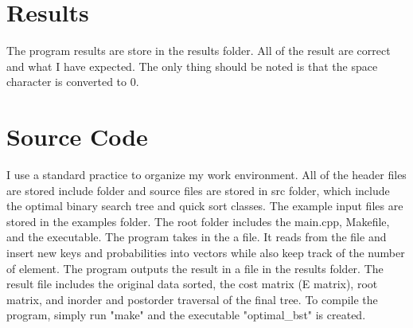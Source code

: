\documentclass[11pt]{article}
\begin{document}
\section{Results}

The program results are store in the results folder.
All of the result are correct and what I have expected.
The only thing should be noted is that the space character is converted to 0.
\section{Source Code}

I use a standard practice to organize my work environment.
All of the header files are stored include folder and source files are stored in src folder, which include the optimal binary search tree and quick sort classes.
The example input files are stored in the examples folder.
The root folder includes the main.cpp, Makefile, and the executable.
The program takes in the a file.
It reads from the file and insert new keys and probabilities into vectors while also keep track of the number of element.
The program outputs the result in a file in the results folder.
The result file includes the original data sorted, the cost matrix (E matrix), root matrix, and inorder and postorder traversal of the final tree.
To compile the program, simply run "make" and the executable "optimal\_bst" is created.
\end{document}
